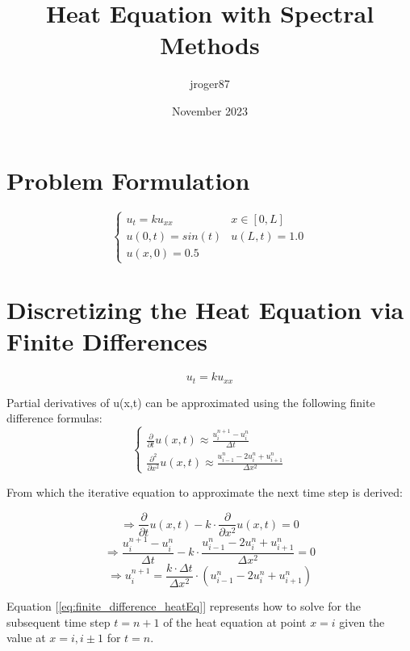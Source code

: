 \documentclass{article}
\title{Heat Equation with Spectral Methods}
\author{jroger87}
\date{November 2023}
\begin{document}
\maketitle

\section{Problem Formulation}

\begin{equation}
    \begin{cases}
        u_t = k u_{xx} & x \in [0, L] \\
        u(0, t) = sin(t) & u(L, t) = 1.0 \\
        u(x, 0) = 0.5 
    \end{cases}
\end{equation}

\section{Discretizing the Heat Equation via Finite Differences}
$$u_t = k u_{xx}$$  

Partial derivatives of u(x,t) can be approximated using the following finite difference formulas:
\begin{equation}
    \begin{cases}
        \frac{\partial}{\partial t} u(x,t) \approx \frac{u_{i}^{n+1} - u_{i}^{n}}{\Delta t} \\
        \frac{\partial^2}{\partial x^2} u(x,t) \approx \frac{u_{i-1}^{n} - 2u_{i}^{n} + u_{i+1}^{n}}{\Delta x^2}        
    \end{cases}
\end{equation}

From which the iterative equation to approximate the next time step is derived:

$$\Rightarrow \frac{\partial}{\partial t} u(x,t) - k \cdot \frac{\partial}{\partial x^2} u(x,t) = 0$$
$$\Rightarrow \frac{u_i^{n+1} - u_i^{n}}{\Delta t} - k \cdot \frac{u_{i-1}^{n} - 2u_{i}^{n} + u_{i+1}^{n}}{\Delta x^2} = 0$$
\begin{equation}
\Rightarrow u_i^{n+1} = \frac{k \cdot \Delta t}{\Delta x^2} \cdot (u_{i-1}^{n} - 2u_{i}^{n} + u_{i+1}^{n})
\label{eq:finite_difference_heatEq}
\end{equation}

Equation [\ref{eq:finite_difference_heatEq}] represents how to solve for the subsequent time step $t=n+1$ of the heat equation at point $x=i$ given the value at $x=i, i\pm 1$ for $t=n$.
\end{document}
